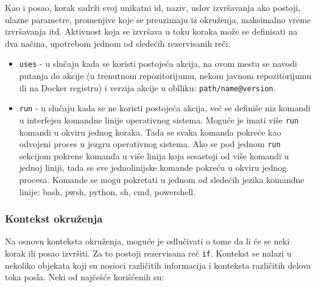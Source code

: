 \documentclass[12pt]{report}
\begin{document}
Kao i posao, korak sadrži svoj unikatni id, naziv, uslov izvršavanja ako postoji, ulazne parametre, promenjive koje se preuzimaju iz okruženja, maksimalno vreme izvršavanja itd. Aktivnost koja se izvršava u toku koraka može se definisati na dva načina, upotrebom jednom od sledećih rezervisanih reči:

\begin{itemize}
    \item\texttt{uses} - u slučaju kada se koristi postojeća akcija, na ovom mestu se navodi putanja do akcije (u trenutnom repozitorijumu, nekom javnom repozitorijumu ili na Docker registru) i verzija akcije u oblliku: \texttt{path/name@version}.
    \item\texttt{run} - u slučaju kada se ne koristi postojeća akcija, već se definiše niz komandi u interfejsu komandne linije operativnog sistema. Moguće je imati više \texttt{run} komandi u okviru jednog koraka. Tada se svaka komanda pokreće kao odvojeni proces u jezgru operativnog sistema. Ako se pod jednom \texttt{run} sekcijom pokrene komanda u više linija koja sesastoji od više komandi u jednoj liniji, tada se sve jednolinijske komande pokreću u okviru jednog procesa. Komande se mogu pokretati u jednom od sledećih jezika komandne linije: bash, pwsh, python, sh, cmd, powershell.
\end{itemize}

\subsubsection{Kontekst okruženja}
Na osnovu konteksta okruženja, moguće je odlučivati o tome da li će se neki korak ili posao izvršiti. Za to postoji rezervisana reč \texttt{if}. Kontekst se nalazi u nekoliko objekata koji su nosioci različitih informacija i konteksta različitih delova toka posla. Neki od najčešće korišćenih su:
\end{document}
